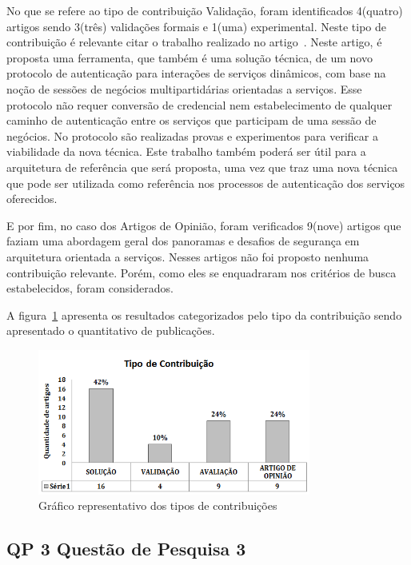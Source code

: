 No que se refere ao tipo de contribuição Validação, foram identificados 4(quatro) artigos  sendo 3(três) validações formais e 1(uma) experimental. Neste tipo de contribuição é relevante citar o trabalho realizado no artigo~\cite{CrossRealmSOA2012}. Neste artigo, é proposta uma ferramenta, que também é uma solução técnica, de um novo protocolo de autenticação para interações de serviços dinâmicos, com base na noção de sessões de negócios multipartidárias orientadas a serviços. Esse protocolo não requer conversão de credencial nem estabelecimento de qualquer caminho de autenticação entre os serviços que participam de uma sessão de negócios. No protocolo são realizadas provas e experimentos para verificar a viabilidade da nova técnica. Este trabalho também poderá ser útil para a arquitetura de referência que será proposta, uma vez que traz uma nova técnica que pode ser utilizada como referência nos processos de autenticação dos serviços oferecidos.

E por fim, no caso dos Artigos de Opinião, foram verificados 9(nove) artigos que faziam uma abordagem geral dos panoramas e desafios de segurança em arquitetura orientada a serviços. Nesses artigos não foi proposto nenhuma contribuição relevante. Porém, como eles se enquadraram nos critérios de busca estabelecidos, foram considerados.

A figura~\ref{fig:Tipo_Contribuicao} apresenta os resultados categorizados pelo tipo da contribuição sendo apresentado o quantitativo de publicações.

\begin{figure}[!htb]
\centering
\includegraphics[width=0.8\textwidth]{tipo_contribuicao_3.png}
\caption{Gráfico representativo dos tipos de contribuições}
\label{fig:Tipo_Contribuicao}
\end{figure}


\subsection{QP 3 \- Questão de Pesquisa 3}

